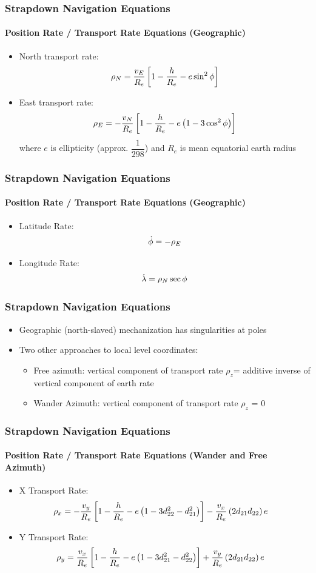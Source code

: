 \begin{frame}
\frametitle{Strapdown Navigation Equations}
\framesubtitle{Position Rate / Transport Rate Equations (Geographic)}
\begin{itemize}
  \item North transport rate:
\begin{equation}\label{trateneq}
\rho_N=\dfrac{v_E}{R_e}\left[1-\dfrac{h}{R_e}-e\sin^2\phi\right]
\end{equation} 
  \item East transport rate:
\begin{equation}\label{trateeeq}
\rho_E=-\dfrac{v_N}{R_e}\left[1-\dfrac{h}{R_e}-e\left(1-3\cos^2 \phi\right)\right]
\end{equation} 
where $e$ is ellipticity (approx. $\dfrac{1}{298}$) and $R_e$ is mean equatorial earth radius
\end{itemize} 
\end{frame}

\begin{frame}
\frametitle{Strapdown Navigation Equations}
\framesubtitle{Position Rate / Transport Rate Equations (Geographic)}
\begin{itemize}
  \item Latitude Rate:
\begin{equation}\label{latrate}
\dot{\phi}=-\rho_E
\end{equation}  
  \item Longitude Rate:
\begin{equation}\label{lonrate}
\dot{\lambda}=\rho_N \sec\phi
\end{equation}  
\end{itemize} 
\end{frame}

\begin{frame}
\frametitle{Strapdown Navigation Equations}
\begin{itemize}
  \item Geographic (north-slaved) mechanization has singularities at poles
  \item Two other approaches to local level coordinates:
  \begin{itemize}
	\item Free azimuth: vertical component of transport rate $\rho_z$= additive inverse of vertical component of earth rate
	\item Wander Azimuth:  vertical component of transport rate $\rho_z$ = 0
  \end{itemize}
\end{itemize} 
\end{frame}

\begin{frame}
\frametitle{Strapdown Navigation Equations}
\framesubtitle{Position Rate / Transport Rate Equations (Wander and Free Azimuth)}
\begin{itemize}
  \item X Transport Rate:
\begin{align}\label{xtrateeq}
\rho_x&=-\dfrac{v_y}{R_e}\left[1-\dfrac{h}{R_e}-e\left(1-3d_{22}^2-d_{21}^2\right)\right]-\dfrac{v_x}{R_e}\left(2d_{21}d_{22}\right)e
\end{align}  
  \item Y Transport Rate:
\begin{align}\label{ytrateeq}
\rho_y&=\dfrac{v_x}{R_e}\left[1-\dfrac{h}{R_e}-e\left(1-3d_{21}^2-d_{22}^2\right)\right]+\dfrac{v_y}{R_e}\left(2d_{21}d_{22}\right)e
\end{align}  
\end{itemize} 
\end{frame}

